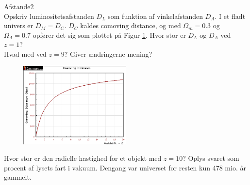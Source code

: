 \begin{opgave}{Afstande}{2}
	\\  
	\opg Opskriv luminositetsafstanden $D_L$ som funktion af vinkelafstanden $D_A$.
	\opg I et fladt univers er $D_M=D_C$. $D_C$ kaldes comoving distance, og med $\Omega_m=0.3$ og $\Omega_{\Lambda}=0.7$ opfører det sig som plottet på Figur \ref{comoving}. 
	Hvor stor er $D_L$ og $D_A$ ved $z=1$? \\
	Hvad med ved $z=9$? Giver ændringerne mening?
		\begin{figure}[h!]
			\centering
			\includegraphics[width=0.5\textwidth]{Astrofysik/Astrofig/ComovingDistance.png}
			\caption{ } %
			\label{comoving} 
		\end{figure}
	\opg Hvor stor er den radielle hastighed for et objekt med $z=10$? Oplys svaret som procent af lysets fart i vakuum. Dengang var universet for resten kun  478 mio. år gammelt.
\end{opgave}

